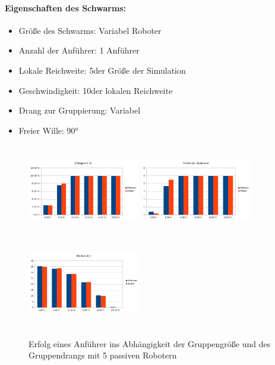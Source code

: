 \paragraph*{Eigenschaften des Schwarms:}
\begin{itemize}
	\item Größe des Schwarms: Variabel Roboter
	\item Anzahl der Anführer: 1 Anführer
	\item Lokale Reichweite: 5\per der Größe der Simulation
	\item Geschwindigkeit: 10\per der lokalen Reichweite
	\item Drang zur Gruppierung: Variabel
	\item Freier Wille: 90°
\end{itemize}

\begin{figure}
	\includegraphics[width=4.9cm, height=4cm]{graphics/Statistics/Leader/FlockSize/5_1.png}
	\includegraphics[width=4.9cm, height=4cm]{graphics/Statistics/Leader/FlockSize/5_2.png}
	\includegraphics[width=4.9cm, height=4cm]{graphics/Statistics/Leader/FlockSize/5_3.png}
	\caption{Erfolg eines Anführer ins Abhängigkeit der Gruppengröße und des Gruppendrangs mit 5 passiven Robotern}
	\label{pic:LeaderSize5}
\end{figure}

